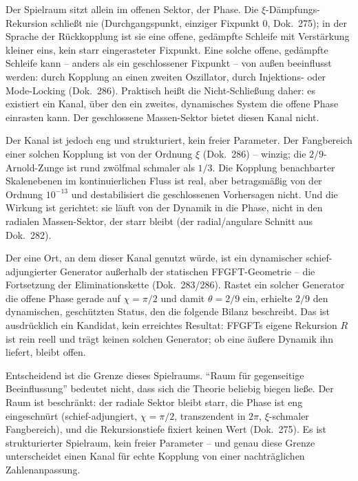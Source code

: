 Der Spielraum sitzt allein im offenen Sektor, der Phase. Die $\xi$-Dämpfungs-Rekursion schließt
nie (Durchgangspunkt, einziger Fixpunkt $0$, Dok.~275); in der Sprache der Rückkopplung ist sie
eine offene, gedämpfte Schleife mit Verstärkung kleiner eins, kein starr eingerasteter Fixpunkt.
Eine solche offene, gedämpfte Schleife kann -- anders als ein geschlossener Fixpunkt -- von außen
beeinflusst werden: durch Kopplung an einen zweiten Oszillator, durch Injektions- oder
Mode-Locking (Dok.~286). Praktisch heißt die Nicht-Schließung daher: es existiert ein Kanal, über
den ein zweites, dynamisches System die offene Phase einrasten kann. Der geschlossene
Massen-Sektor bietet diesen Kanal nicht.

Der Kanal ist jedoch eng und strukturiert, kein freier Parameter. Der Fangbereich einer solchen
Kopplung ist von der Ordnung $\xi$ (Dok.~286) -- winzig; die $2/9$-Arnold-Zunge ist rund
zwölfmal schmaler als $1/3$. Die Kopplung benachbarter Skalenebenen im kontinuierlichen Fluss ist
real, aber betragsmäßig von der Ordnung $10^{-13}$ und destabilisiert die geschlossenen
Vorhersagen nicht. Und die Wirkung ist gerichtet: sie läuft von der Dynamik in die Phase, nicht in
den radialen Massen-Sektor, der starr bleibt (der radial/angulare Schnitt aus Dok.~282).

Der eine Ort, an dem dieser Kanal genutzt würde, ist ein dynamischer schief-adjungierter Generator
außerhalb der statischen FFGFT-Geometrie -- die Fortsetzung der Eliminationskette (Dok.~283/286).
Rastet ein solcher Generator die offene Phase gerade auf $\chi=\pi/2$ und damit $\theta=2/9$ ein,
erhielte $2/9$ den dynamischen, geschützten Status, den die folgende Bilanz beschreibt. Das ist
ausdrücklich ein Kandidat, kein erreichtes Resultat: FFGFTs eigene Rekursion $R$ ist rein reell und
trägt keinen solchen Generator; ob eine äußere Dynamik ihn liefert, bleibt offen.

Entscheidend ist die Grenze dieses Spielraums. \enquote{Raum für gegenseitige Beeinflussung}
bedeutet nicht, dass sich die Theorie beliebig biegen ließe. Der Raum ist beschränkt: der radiale
Sektor bleibt starr, die Phase ist eng eingeschnürt (schief-adjungiert, $\chi=\pi/2$, transzendent
in $2\pi$, $\xi$-schmaler Fangbereich), und die Rekursionstiefe fixiert keinen Wert (Dok.~275). Es
ist strukturierter Spielraum, kein freier Parameter -- und genau diese Grenze unterscheidet einen
Kanal für echte Kopplung von einer nachträglichen Zahlenanpassung.

